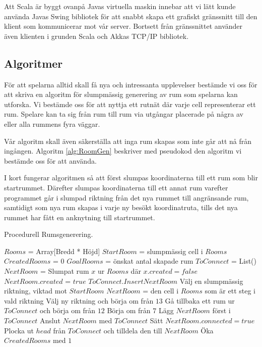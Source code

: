 \documentclass[a4paper]{article}
\begin{document}
Att Scala är byggt ovanpå Javas virtuella maskin innebar att vi lätt kunde använda Javas Swing bibliotek för att snabbt skapa
ett grafiskt gränssnitt till den klient som kommunicerar mot vår server. Bortsett från gränssnittet använder även klienten i
grunden Scala och Akkas TCP/IP bibliotek.
\subsection{Algoritmer}
För att spelarna alltid skall få  nya och intressanta upplevelser bestämde vi oss för att skriva en algoritm för slumpmässig generering av rum som spelarna kan utforska. Vi
bestämde oss för att nyttja ett rutnät där varje cell representerar ett rum. Spelare kan ta sig från rum till rum via utgångar placerade på några av eller alla rummens fyra väggar.
 
Vår algoritm skall även säkerställa att inga rum skapas som inte går att nå från ingången. Algoritm \ref{alg:RoomGen} beskriver med pseudokod den algoritm vi bestämde oss för att använda. 

I kort fungerar algoritmen så att först slumpas koordinaterna till ett rum som blir startrummet.
Därefter slumpas koordinaterna till ett annat rum varefter programmet går i slumpad riktning från det nya rummet 
till angränsande rum, samtidigt som nya rum skapas i varje ny besökt koordinatruta, tills det nya rummet har fått 
en anknytning till startrummet.
\begin{algorithm}
\caption{Procedurell Rumsgenerering.}
\label{alg:RoomGen}
\begin{algorithmic}[1]
\State  $Rooms$ = Array[Bredd * Höjd]
\State  $StartRoom$ = slumpmässig cell i $Rooms$
\State  $CreatedRooms$ = $0$
\State  $GoalRooms$ = önskat antal skapade rum
\Repeat
\State $ToConnect$ = List()
\State $NextRoom$  =  Slumpat rum $x$ ur $Rooms$ där $x.created = false$
\State $NextRoom.created$ = $true$
\State $ToConnect.Insert NextRoom$
\State Välj en slumpmässig riktning, viktad mot $StartRoom$
\State $NextRoom$ = den cell i $Rooms$ som är ett steg i vald riktning
\State Välj ny riktning och börja om från $13$
\State Gå tillbaka ett rum ur $ToConnect$ och börja om från $12$
\State Börja om från $7$
\EndIf
\EndIf
{}
\State Lägg $NextRoom$ först i $ToConnect$
\EndIf
\EndWhile
{}
\State Anslut $NextRoom$ med $ToConnect$
\State Sätt $NextRoom.connected = true$
\State Plocka ut $head$ från $ToConnect$ och tilldela den till $NextRoom$
\State Öka $CreatedRooms$ med $1$
\EndWhile
{}
\EndFunction
\end{algorithmic}

\end{algorithm}
\end{document}
